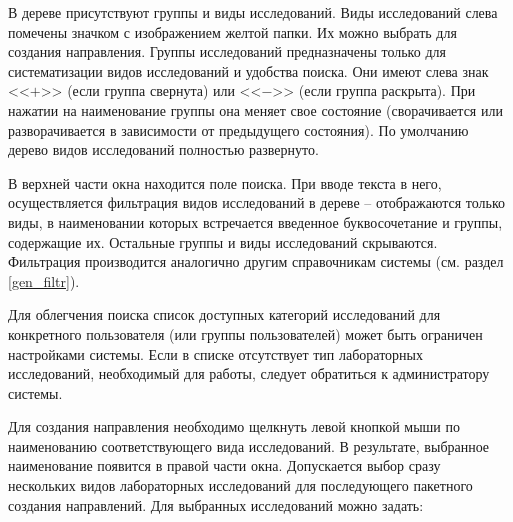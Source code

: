 {В дереве присутствуют группы и виды исследований. Виды исследований слева помечены значком с изображением желтой папки. Их можно выбрать для создания направления. Группы исследований предназначены только для систематизации видов исследований и удобства поиска. Они имеют слева знак <<$+$>> (если группа свернута) или <<$-$>> (если группа раскрыта). При нажатии на наименование группы она меняет свое состояние (сворачивается или разворачивается в зависимости от предыдущего состояния). По умолчанию дерево видов исследований полностью развернуто. 

В верхней части окна находится поле поиска. При вводе текста в него, осуществляется фильтрация видов исследований в дереве -- отображаются только виды, в наименовании которых встречается введенное буквосочетание и группы, содержащие их. Остальные  группы и виды исследований скрываются. Фильтрация производится аналогично другим справочникам системы (см. раздел \ref{gen_filtr}). 



\begin{prim}
 Для облегчения поиска список доступных категорий исследований для конкретного пользователя (или группы пользователей) может быть ограничен настройками системы. Если в списке отсутствует тип лабораторных исследований, необходимый для работы, следует обратиться к администратору системы.
\end{prim} 

Для создания направления необходимо щелкнуть левой кнопкой мыши по наименованию соответствующего вида исследований. В результате, выбранное наименование появится в правой части окна. Допускается выбор сразу нескольких видов лабораторных исследований для последующего пакетного создания направлений. Для выбранных исследований можно задать:

}
